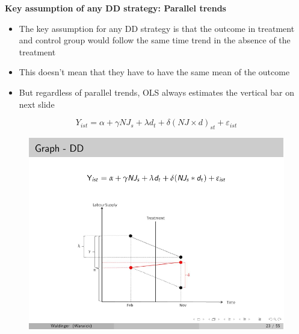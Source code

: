 \documentclass[notes=show]{beamer}
\begin{document}
\begin{frame}[plain]
	\begin{center}
	\textbf{Key assumption of any DD strategy: Parallel trends}
	\end{center}
	
	\begin{itemize}
	\item The key assumption for any DD strategy is that the outcome in treatment and control group would follow the same time trend in the absence of the treatment
	\item This doesn't mean that they have to have the same mean of the outcome
	\item But regardless of parallel trends, OLS always estimates the vertical bar on next slide
	\end{itemize}
	

\end{frame}





\begin{frame}[plain]
	$$Y_{ist} = \alpha + \gamma NJ_s + \lambda d_t + \delta(NJ\times d)_{st} + \varepsilon_{ist}$$
	\begin{figure}
	\includegraphics[scale=0.90]{./lecture_includes/waldinger_dd_5.pdf}
	\end{figure}
\end{frame}
\end{document}
